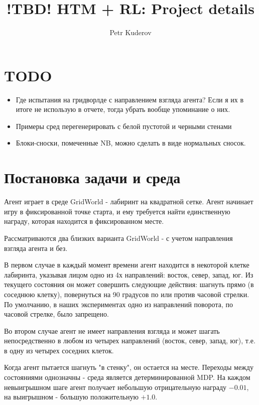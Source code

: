 \documentclass[a4paper]{article}
\begin{document}
\title {!TBD! HTM + RL: Project details}
\author {Petr Kuderov}
\maketitle

\section{TODO}

\begin{itemize}
  \item Где испытания на гридворлде с направлением взгляда агента? Если я их в итоге не использую в отчете, тогда убрать вообще упоминание о них.
  \item Примеры сред перегенерировать с белой пустотой и черными стенами
  \item Блоки-сноски, помеченные NB, можно сделать в виде нормальных сносок.
\end{itemize}

\section {Постановка задачи и среда}

Агент играет в среде GridWorld - лабиринт на квадратной сетке. Агент начинает игру в фиксированной точке старта, и ему требуется найти единственную награду, которая находится в фиксированном месте.

Рассматриваются два близких варианта GridWorld - с учетом направления взгляда агента и без.

В первом случае в каждый момент времени агент находится в некоторой клетке лабиринта, указывая лицом одно из 4х направлений: восток, север, запад, юг. Из текущего состояния он может совершить следующие действия: шагнуть прямо (в соседнюю клетку), повернуться на 90 градусов по или против часовой стрелки. По умолчанию, в наших экспериментах одно из направлений поворота, по часовой стрелке, было запрещено.

Во втором случае агент не имеет направления взгляда и может шагать непосредственно в любом из четырех направлений (восток, север, запад, юг), т.е. в одну из четырех соседних клеток.

Когда агент пытается шагнуть "в стенку", он остается на месте. Переходы между состояниями однозначны - среда является детерминированной MDP. На каждом невыигрышном шаге агент получает небольшую отрицательную награду $-0.01$, на выигрышном - большую положительную $+1.0$.
\end{document}
